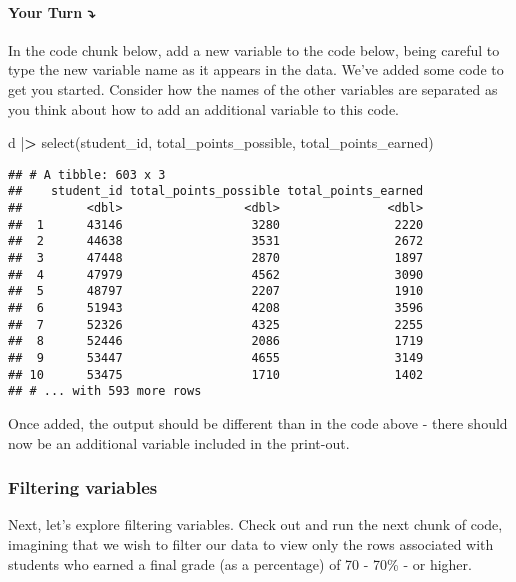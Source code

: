 \documentclass[
]{article}
\newenvironment{Shaded}{\begin{snugshade}}{\end{snugshade}}
\newcommand{\ErrorTok}[1]{\textcolor[rgb]{0.64,0.00,0.00}{\textbf{#1}}}
\newcommand{\FunctionTok}[1]{\textcolor[rgb]{0.00,0.00,0.00}{#1}}
\newcommand{\NormalTok}[1]{#1}
\newcommand{\SpecialCharTok}[1]{\textcolor[rgb]{0.00,0.00,0.00}{#1}}
\begin{document}
\hypertarget{your-turn-2}{%
\paragraph{\texorpdfstring{{\textbf{Your Turn}}
\textbf{⤵}}{Your Turn ⤵}}\label{your-turn-2}}

In the code chunk below, add a new variable to the code below, being
careful to type the new variable name as it appears in the data. We've
added some code to get you started. Consider how the names of the other
variables are separated as you think about how to add an additional
variable to this code.

\begin{Shaded}
\begin{Highlighting}[]
\NormalTok{d }\SpecialCharTok{|}\ErrorTok{\textgreater{}} 
  \FunctionTok{select}\NormalTok{(student\_id, total\_points\_possible, total\_points\_earned)}
\end{Highlighting}
\end{Shaded}

\begin{verbatim}
## # A tibble: 603 x 3
##    student_id total_points_possible total_points_earned
##         <dbl>                 <dbl>               <dbl>
##  1      43146                  3280                2220
##  2      44638                  3531                2672
##  3      47448                  2870                1897
##  4      47979                  4562                3090
##  5      48797                  2207                1910
##  6      51943                  4208                3596
##  7      52326                  4325                2255
##  8      52446                  2086                1719
##  9      53447                  4655                3149
## 10      53475                  1710                1402
## # ... with 593 more rows
\end{verbatim}

Once added, the output should be different than in the code above -
there should now be an additional variable included in the print-out.

\hypertarget{filtering-variables}{%
\subsubsection{Filtering variables}\label{filtering-variables}}

Next, let's explore filtering variables. Check out and run the next
chunk of code, imagining that we wish to filter our data to view only
the rows associated with students who earned a final grade (as a
percentage) of 70 - 70\% - or higher.
\end{document}
